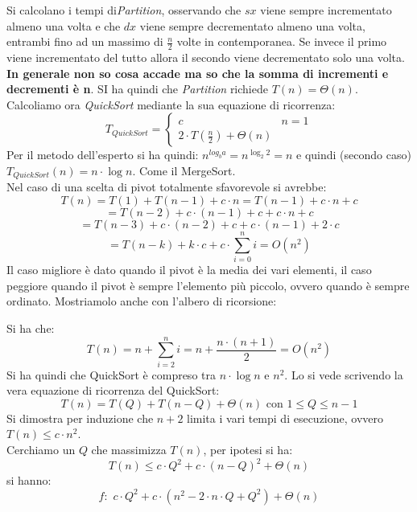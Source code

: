 \documentclass[a4paper,12pt,oneside,tikz]{book}
\begin{document}
Si calcolano i tempi di\textit{Partition}, osservando che $sx$ viene sempre incrementato almeno una volta e che $dx$ viene sempre decrementato almeno una volta, entrambi fino ad un massimo di $\frac{n}{2}$ volte in contemporanea. Se invece il primo viene incrementato del tutto allora il secondo viene decrementato solo una volta. \textbf{In generale non so cosa accade ma so che la somma di incrementi e decrementi è n}. SI ha quindi che \textit{Partition} richiede $T(n)=\Theta(n)$.\\
Calcoliamo ora \textit{QuickSort} mediante la sua equazione di ricorrenza:
$$T_{QuickSort}=\begin{cases}
		c & n=1 \\
		2\cdot T\left(\frac{n}{2}\right)+\Theta(n)
	\end{cases}$$
Per il metodo dell'esperto si ha quindi: $n^{log_b a}=n^{\log_2  2}=n$ e quindi (secondo caso) $T_{QuickSort}(n)=n\cdot\log n$. Come il MergeSort.\\
Nel caso di una scelta di pivot totalmente sfavorevole si avrebbe:
$$T(n)=T(1)+T(n-1)+c\cdot n=T(n-1)+c\cdot n+c$$
$$=T(n-2)+c\cdot (n-1)+c+c\cdot n+c$$
$$=T(n-3)+c\cdot(n-2)+c+c\cdot(n-1)+2\cdot c$$
$$=T(n-k)+k\cdot c+c\cdot \sum_{i=0}^n i=O(n^2)$$
Il caso migliore è dato quando il pivot è la media dei vari elementi, il caso peggiore quando il pivot è sempre l'elemento più piccolo, ovvero quando è sempre ordinato.
\newpage
Mostriamolo anche con l'albero di ricorsione:
\begin{center}
\end{center}
Si ha che:
$$T(n)=n+\sum_{i=2}^ni=n+\frac{n\cdot(n+1)}{2}=O(n^2)$$
Si ha quindi che QuickSort è compreso tra $n\cdot\log n$ e $n^2$. Lo si vede scrivendo la vera equazione di ricorrenza del QuickSort:
$$T(n)=T(Q)+T(n-Q)+\Theta(n) \mbox{ con } 1\leq Q	\leq n-1$$
Si dimostra per induzione che $n+2$ limita i vari tempi di esecuzione, ovvero $T(n)\leq c\cdot n^2$.\\Cerchiamo un $Q$ che massimizza $T(n)$, per ipotesi si ha:
$$T(n)\leq c\cdot Q^2+c\cdot(n-Q)^2+\Theta(n)$$
si hanno:
$$f:\,\, c\cdot Q^2+c\cdot(n^2-2\cdot n\cdot Q+Q^2)+\Theta(n)$$
\end{document}
